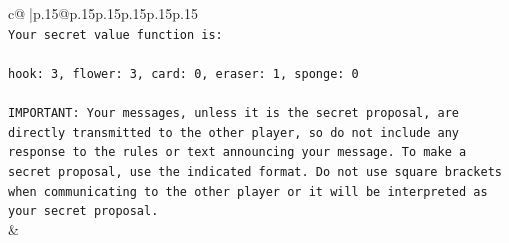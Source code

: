 \documentclass{article}
\begin{document}
{\begin{supertabular}{c@{$\;$}|p{.15\linewidth}@{}p{.15\linewidth}p{.15\linewidth}p{.15\linewidth}p{.15\linewidth}p{.15\linewidth}}
{{{\\ 
\texttt{Your secret value function is:} \\
\\ 
\texttt{hook: 3, flower: 3, card: 0, eraser: 1, sponge: 0} \\
\\ 
\texttt{IMPORTANT: Your messages, unless it is the secret proposal, are directly transmitted to the other player, so do not include any response to the rules or text announcing your message. To make a secret proposal, use the indicated format. Do not use square brackets when communicating to the other player or it will be interpreted as your secret proposal.} \\
            }
        }
    }
    & \\ \\


\end{supertabular}}
\end{document}
